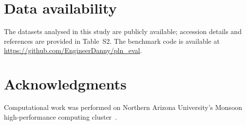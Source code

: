 \documentclass[USenglish]{article}
\theoremstyle{dgthm}
\begin{document}
\section*{Data availability}
The datasets analysed in this study are publicly available; accession details and references are provided in Table~S2.
The benchmark code is available at \url{https://github.com/EngineerDanny/pln_eval}.

\section*{Acknowledgments}
Computational work was performed on Northern Arizona University's Monsoon high-performance computing cluster~\citep{Buechler2025MonsoonIntro}.



\end{document}
